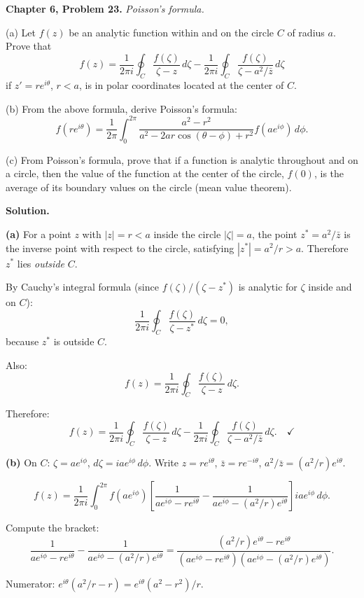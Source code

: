 \documentclass[12pt]{article}
\begin{document}
\textbf{Chapter 6, Problem 23.} \textit{Poisson's formula.}

(a) Let $f(z)$ be an analytic function within and on the circle $C$ of radius $a$. Prove that
\[
f(z) = \frac{1}{2\pi i}\oint_C \frac{f(\zeta)}{\zeta - z}\,d\zeta - \frac{1}{2\pi i}\oint_C \frac{f(\zeta)}{\zeta - a^2/\bar{z}}\,d\zeta
\]
if $z' = re^{i\theta}$, $r < a$, is in polar coordinates located at the center of $C$.

(b) From the above formula, derive Poisson's formula:
\[
f(re^{i\theta}) = \frac{1}{2\pi}\int_0^{2\pi}\frac{a^2-r^2}{a^2-2ar\cos(\theta-\phi)+r^2}f(ae^{i\phi})\,d\phi.
\]

(c) From Poisson's formula, prove that if a function is analytic throughout and on a circle, then the value of the function at the center of the circle, $f(0)$, is the average of its boundary values on the circle (mean value theorem).

\bigskip
\textbf{Solution.}

\textbf{(a)} For a point $z$ with $|z| = r < a$ inside the circle $|{\zeta}| = a$, the point $z^* = a^2/\bar{z}$ is the inverse point with respect to the circle, satisfying $|z^*| = a^2/r > a$. Therefore $z^*$ lies \emph{outside} $C$.

By Cauchy's integral formula (since $f(\zeta)/(\zeta - z^*)$ is analytic for $\zeta$ inside and on $C$):
\[
\frac{1}{2\pi i}\oint_C \frac{f(\zeta)}{\zeta - z^*}\,d\zeta = 0,
\]
because $z^*$ is outside $C$.

Also:
\[
f(z) = \frac{1}{2\pi i}\oint_C \frac{f(\zeta)}{\zeta - z}\,d\zeta.
\]

Therefore:
\[
f(z) = \frac{1}{2\pi i}\oint_C \frac{f(\zeta)}{\zeta-z}\,d\zeta - \frac{1}{2\pi i}\oint_C \frac{f(\zeta)}{\zeta - a^2/\bar{z}}\,d\zeta. \quad \checkmark
\]

\textbf{(b)} On $C$: $\zeta = ae^{i\phi}$, $d\zeta = iae^{i\phi}\,d\phi$. Write $z = re^{i\theta}$, $\bar{z} = re^{-i\theta}$, $a^2/\bar{z} = (a^2/r)e^{i\theta}$.

\[
f(z) = \frac{1}{2\pi i}\int_0^{2\pi} f(ae^{i\phi})\left[\frac{1}{ae^{i\phi}-re^{i\theta}} - \frac{1}{ae^{i\phi}-(a^2/r)e^{i\theta}}\right]iae^{i\phi}\,d\phi.
\]

Compute the bracket:
\[
\frac{1}{ae^{i\phi}-re^{i\theta}} - \frac{1}{ae^{i\phi}-(a^2/r)e^{i\theta}}
= \frac{(a^2/r)e^{i\theta}-re^{i\theta}}{(ae^{i\phi}-re^{i\theta})(ae^{i\phi}-(a^2/r)e^{i\theta})}.
\]

Numerator: $e^{i\theta}(a^2/r - r) = e^{i\theta}(a^2-r^2)/r$.
\end{document}
